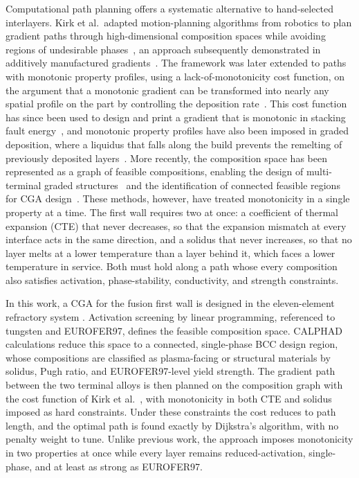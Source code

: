 Computational path planning offers a systematic alternative to hand-selected
interlayers. Kirk et al.\ adapted motion-planning algorithms from robotics to plan
gradient paths through high-dimensional composition spaces while avoiding regions
of undesirable phases~\cite{kirk2018gradient}, an approach subsequently
demonstrated in additively manufactured gradients~\cite{eliseeva2019fgm}. The
framework was later extended to paths with monotonic property profiles, using a
lack-of-monotonicity cost function, on the argument that a monotonic gradient can
be transformed into nearly any spatial profile on the part by controlling the
deposition rate~\cite{kirk2021monotonic}. This cost function has since been used to
design and print a gradient that is monotonic in stacking fault
energy~\cite{hanagan2025sfe}, and monotonic property profiles have also been
imposed in graded deposition, where a liquidus that falls along the build prevents
the remelting of previously deposited layers~\cite{glerum2026ss316tzm}. More
recently, the composition space has been represented as a graph of feasible
compositions, enabling the design of multi-terminal graded
structures~\cite{multiterminalCGA2024} and the identification of connected feasible
regions for CGA design~\cite{obrist2026graph}. These methods, however, have treated
monotonicity in a single property at a time. The first wall requires two at once:
a coefficient of thermal expansion (CTE) that never decreases, so that the
expansion mismatch at every interface acts in the same direction, and a solidus
that never increases, so that no layer melts at a lower temperature than a layer
behind it, which faces a lower temperature in service. Both must hold along a path
whose every composition also satisfies activation, phase-stability, conductivity,
and strength constraints.

In this work, a CGA for the fusion first wall is designed in the eleven-element
refractory system . Activation screening by
linear programming, referenced to tungsten and EUROFER97, defines the feasible
composition space. CALPHAD calculations reduce this space to a connected,
single-phase BCC design region, whose compositions are classified as plasma-facing
or structural materials by solidus, Pugh ratio, and EUROFER97-level yield strength.
The gradient path between the two terminal alloys is then planned on the
composition graph with the cost function of Kirk et al.~\cite{kirk2021monotonic},
with monotonicity in both CTE and solidus imposed as hard constraints. Under these
constraints the cost reduces to path length, and the optimal path is found exactly
by Dijkstra's algorithm, with no penalty weight to tune. Unlike previous work, the
approach imposes monotonicity in two properties at once while every layer remains
reduced-activation, single-phase, and at least as strong as EUROFER97.

